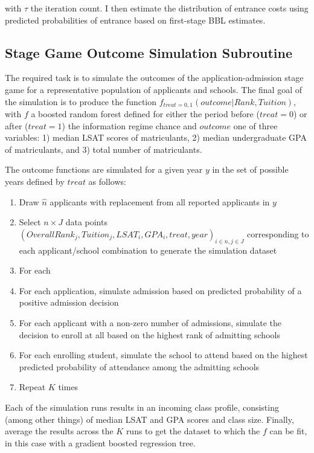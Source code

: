 \documentclass[12pt]{article}
\theoremstyle{definition}
\begin{document}
with $\tau$ the iteration count. I then estimate the distribution of entrance costs using predicted probabilities of entrance based on first-stage BBL estimates. 


\subsection{Stage Game Outcome Simulation Subroutine}
\label{app:appadmit_sim}

The required task is to simulate the outcomes of the application-admission stage game for a representative population of applicants and schools. The final goal of the simulation is to produce the function $f_{treat=0, 1}(outcome | Rank, Tuition)$, with $f$ a boosted random forest defined for either the period before ($treat=0$) or after ($treat=1$) the information regime chance and $outcome$ one of three variables: 1) median LSAT scores of matriculants, 2) median undergraduate GPA of matriculants, and 3) total number of matriculants.

The outcome functions are simulated for a given year $y$ in the set of possible years defined by $treat$ as follows:
\begin{enumerate}
  \item Draw $\hat{n}$ applicants with replacement from all reported applicants in $y$
  \item Select $n\times J$ data points $(OverallRank_j, Tuition_j, LSAT_i, GPA_i, treat, year)_{i\in n, j\in J}$ corresponding to each applicant/school combination to generate the simulation dataset
  \item For each 
  \item For each application, simulate admission based on predicted probability of a positive admission decision
  \item For each applicant with a non-zero number of admissions, simulate the decision to enroll at all based on the highest rank of admitting schools
  \item For each enrolling student, simulate the school to attend based on the highest predicted probability of attendance among the admitting schools
  \item Repeat $K$ times
\end{enumerate}
Each of the simulation runs results in an incoming class profile, consisting (among other things) of median LSAT and GPA scores and class size. Finally, average the results across the $K$ runs to get the dataset to which the $f$ can be fit, in this case with a gradient boosted regression tree.
\end{document}
